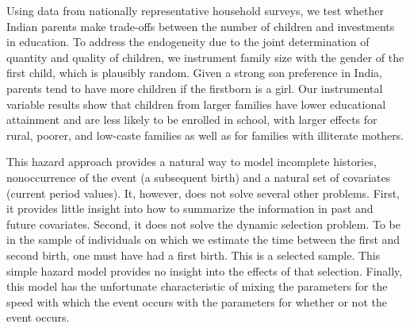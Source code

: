 \citep{Kugler2017}

Using data from nationally representative household surveys, we test whether Indian parents make trade-offs between the number of children and investments in education. To address the endogeneity due to the joint determination of quantity and quality of children, we instrument family size with the gender of the first child, which is plausibly random. Given a strong son preference in India, parents tend to have more children if the firstborn is a girl. Our instrumental variable results show that children from larger families have lower educational attainment and are less likely to be enrolled in school, with larger effects for rural, poorer, and low-caste families as well as for families with illiterate mothers.

\citep{Hotz1997}

This hazard approach provides a natural way to model incomplete histories, nonoccurrence of the event (a subsequent birth) and a natural set of covariates (current period values). It, however, does not solve several other problems. First, it provides
little insight into how to summarize the information in past and future covariates. Second, it does not solve the dynamic selection problem. To be in the sample of individuals on which we estimate the time between the first and second birth, one must have had a first birth. This is a selected sample. This simple hazard model provides no insight into the effects of that selection. Finally, this model has the unfortunate characteristic of mixing the parameters for the speed with which the event occurs with the parameters for whether or not the event occurs.


